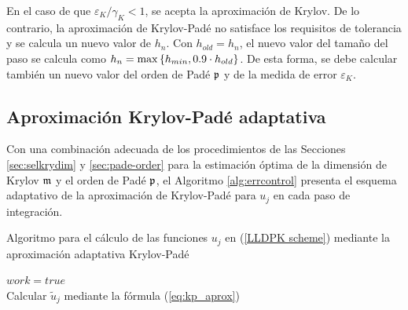 En el caso de que $\varepsilon_{K}/\gamma_K< 1$, se acepta la aproximación de Krylov. De lo contrario, la aproximación de Krylov-Padé no satisface los requisitos de tolerancia y se calcula un nuevo valor de $h_n$. Con $h_{old}=h_n$, el nuevo valor del tamaño del paso se calcula como $h_n=\max\left\{ h_{min},0\mathord{.}9\cdot h_{old} \right\}$. De esta forma, se debe calcular también un nuevo valor del orden de Padé $\mathfrak{p}$ y de la medida de error $\varepsilon_{K}$.

\subsection{Aproximación Krylov-Padé adaptativa}\label{secc:krylov-Pade}
Con una combinación adecuada de los procedimientos de las Secciones \ref{sec:selkrydim} y \ref{sec:pade-order} para la estimación óptima de la dimensión de Krylov $\mathfrak{m}$ y el orden de Padé $\mathfrak{p}$, el Algoritmo \ref{alg:errcontrol} presenta el esquema adaptativo de la aproximación de Krylov-Padé para $u_j$ en cada paso de integración.

{\SetAlgoNoLine
\begin{algorithm}[!htb]
	\caption{Algoritmo para el cálculo de las funciones $u_j$ en (\ref{LLDPK scheme}) mediante la aproximación adaptativa Krylov-Padé}
	\label{alg:errcontrol}
	$work=true$\\
	Calcular $\widetilde{u}_j$ mediante la fórmula (\ref{eq:kp_aprox})\\
\end{algorithm}}

